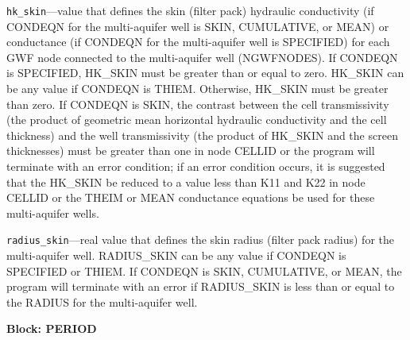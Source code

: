 \begin{description}
\item \texttt{hk\_skin}---value that defines the skin (filter pack) hydraulic conductivity (if CONDEQN for the multi-aquifer well is SKIN, CUMULATIVE, or MEAN) or conductance (if CONDEQN for the multi-aquifer well is SPECIFIED) for each GWF node connected to the multi-aquifer well (NGWFNODES). If CONDEQN is SPECIFIED, HK\_SKIN must be greater than or equal to zero.  HK\_SKIN can be any value if CONDEQN is THIEM. Otherwise, HK\_SKIN must be greater than zero. If CONDEQN is SKIN, the contrast between the cell transmissivity (the product of geometric mean horizontal hydraulic conductivity and the cell thickness) and the well transmissivity (the product of HK\_SKIN and the screen thicknesses) must be greater than one in node CELLID or the program will terminate with an error condition; if an error condition occurs, it is suggested that the HK\_SKIN be reduced to a value less than K11 and K22 in node CELLID or the THEIM or MEAN conductance equations be used for these multi-aquifer wells.

\item \texttt{radius\_skin}---real value that defines the skin radius (filter pack radius) for the multi-aquifer well. RADIUS\_SKIN can be any value if CONDEQN is SPECIFIED or THIEM. If CONDEQN is SKIN, CUMULATIVE, or MEAN, the program will terminate with an error if  RADIUS\_SKIN is less than or equal to the RADIUS for the multi-aquifer well.

\end{description}
\item \textbf{Block: PERIOD}

